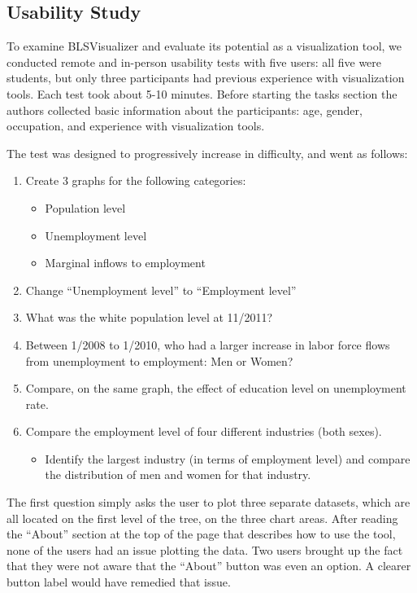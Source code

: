 \documentclass[11pt,letterpaper]{article}
\begin{document}
\subsection{Usability Study}

To examine BLSVisualizer and evaluate its potential as a visualization tool, we conducted remote and in-person usability tests with five users: all five were students, but only three participants had previous experience with visualization tools. Each test took about 5-10 minutes. Before starting the tasks section the authors collected basic information about the participants: age, gender, occupation, and experience with visualization tools.

The test was designed to progressively increase in difficulty, and went as follows:

\begin{enumerate}
  \item Create 3 graphs for the following categories:

\begin{itemize}
  \item Population level
  \item Unemployment level
  \item Marginal inflows to employment
\end{itemize}

  \item Change ``Unemployment level'' to ``Employment level''
  \item What was the white population level at 11/2011?
  \item Between 1/2008 to 1/2010, who had a larger increase in labor force flows from unemployment to employment: Men or Women?
  \item Compare, on the same graph, the effect of education level on unemployment rate.
  \item Compare the employment level of four different industries (both sexes).
\begin{itemize}
  \item Identify the largest industry (in terms of employment level) and compare the distribution of men and women for that industry.
\end{itemize}

\end{enumerate}

The first question simply asks the user to plot three separate datasets, which are all located on the first level of the tree, on the three chart areas. After reading the ``About'' section at the top of the page that describes how to use the tool, none of the users had an issue plotting the data. Two users brought up the fact that they were not aware that the ``About'' button was even an option. A clearer button label would have remedied that issue.
\end{document}
